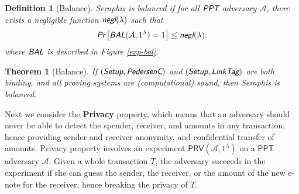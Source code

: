 \documentclass{article}
\newtheorem{definition}{Definition}[section]
\newtheorem{theorem}{Theorem}[section]
\begin{document}
\begin{definition}[Balance]
Seraphis is balanced if for all $\emph{\textsf{PPT}}$ adversary $\mathcal{A}$, there exists a negligible function $\emph{\textsf{negl}}(\lambda)$ such that
\begin{align*}
\emph{\textsf{Pr}}
\left[
\emph{\textsf{BAL}}(\mathcal{A}, 1^{\lambda})=1
\right]
\le \emph{\textsf{negl}}(\lambda).
\end{align*}
where $\emph{\textsf{BAL}}$ is described in Figure \ref{exp-bal}.
\end{definition}
\begin{theorem}[Balance]\label{thm-bal}
If $(\emph{\textsf{Setup}},\emph{\textsf{PedersenC}})$ and $(\emph{\textsf{Setup}},\emph{\textsf{LinkTag}})$ are both binding, and all proving systems are (computational) sound, then Seraphis is balanced.  
\end{theorem}
Next we consider the \textbf{Privacy} property, which means that an adversary should never be able to detect the spender, receiver, and amounts in any transaction, hence providing sender and receiver anonymity, and confidential transfer of amounts. Privacy property involves an experiment $\textsf{PRV}(\mathcal{A}, 1^{\lambda})$ on a $\textsf{PPT}$ adversary $\mathcal{A}$. Given a whole transaction $T$, the adversary succeeds in the experiment if she can guess the sender, the receiver, or the amount of the new e-note for the receiver, hence breaking the privacy of $T$.
\end{document}

